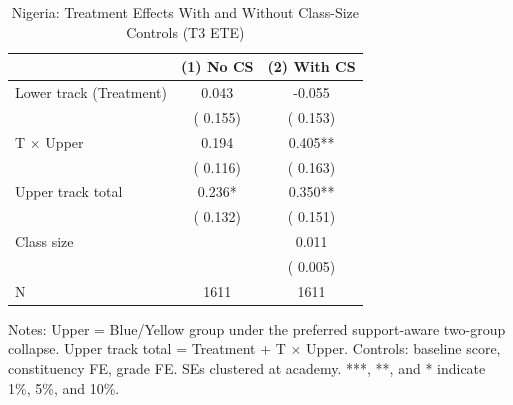 \begin{table}[!htbp]
\centering
\caption{Nigeria: Treatment Effects With and Without Class-Size Controls (T3 ETE)}
\label{tab:ng_classsize_ctrl}
\begin{threeparttable}
\begin{tabular}[t]{lcc}
\toprule
 & (1) No CS & (2) With CS \\
\midrule
Lower track (Treatment) &   0.043 &  -0.055 \\
 & (  0.155) & (  0.153) \\
\addlinespace
T $\times$ Upper &   0.194 &   0.405** \\
 & (  0.116) & (  0.163) \\
\addlinespace
Upper track total &   0.236* &   0.350** \\
 & (  0.132) & (  0.151) \\
\addlinespace
Class size & &   0.011 \\
 & & (  0.005) \\
\addlinespace
N & 1611 & 1611 \\
\bottomrule
\end{tabular}
\begin{tablenotes}[para]
\item Notes: Upper = Blue/Yellow group under the preferred support-aware two-group collapse. Upper track total = Treatment + T $\times$ Upper. Controls: baseline score, constituency FE, grade FE. SEs clustered at academy. ***, **, and * indicate 1\%, 5\%, and 10\%.
\end{tablenotes}
\end{threeparttable}
\end{table}
